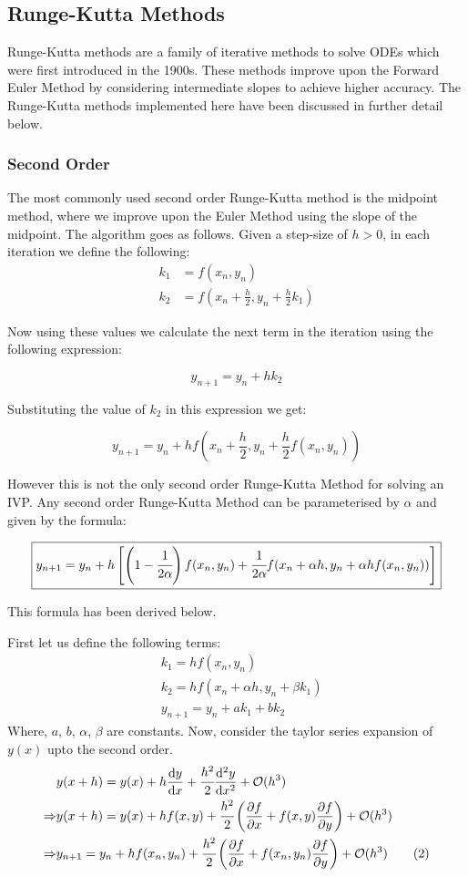 \documentclass{scrartcl}
\newcommand{\bigO}{\mathcal{O}}
\begin{document}
\subsection{Runge-Kutta Methods}
Runge-Kutta methods are a family of iterative methods to solve ODEs which were first introduced in the 1900s. These methods improve upon the Forward Euler Method by considering intermediate slopes to achieve higher accuracy. The Runge-Kutta methods implemented here have been discussed in further detail below.
\subsubsection{Second Order}
The most commonly used second order Runge-Kutta method is the midpoint method, where we improve upon the Euler Method using the slope of the midpoint. The algorithm goes as follows. Given a step-size of $h > 0$, in each iteration we define the following:
\begin{align*}
    k_1 &= f(x_n , y_n) \\
    k_2 &= f\left(x_n + \frac{h}{2}, y_n + \frac{h}{2}k_1\right)
\end{align*}

Now using these values we calculate the next term in the iteration using the following expression:

$$y_{n + 1} = y_n + hk_2$$

Substituting the value of $k_2$ in this expression we get:

$$\boxed{y_{n + 1} = y_n + hf\left(x_n + \frac{h}{2}, y_n + \frac{h}{2}f(x_n , y_n)\right)}$$

However this is not the only second order Runge-Kutta Method for solving an IVP. Any second order 
Runge-Kutta Method can be parameterised by $\alpha$ and given by the formula:

$$\boxed{y_{n+1} = y_n + h\left[\left(1 - \cfrac{1}{2\alpha}\right)f(x_n, y_n) + \cfrac{1}{2\alpha}f(x_n + \alpha h, y_n + \alpha hf(x_n, y_n))\right]}$$

This formula has been derived below. 

First let us define the following terms:
\begin{align*}
    &k_1 = hf(x_n, y_n) \\
    &k_2 = hf(x_n + \alpha h, y_n + \beta k_1) \\
    &y_{n+1} = y_n + ak_1 + bk_2 \tag{1}
\end{align*}
Where, $a$, $b$, $\alpha$, $\beta$ are constants.
Now, consider the taylor series expansion of $y(x)$ upto the second order.
\begin{align*}
    &y(x + h) = y(x) + h\dv{y}{x} + \cfrac{h^2}{2} \dv[2]{y}{x} + \bigO(h^3) \\
    \Rightarrow &y(x + h) = y(x) + hf(x, y) + \cfrac{h^2}{2}\left(\pdv{f}{x} + f(x, y)\pdv{f}{y}\right) + \bigO(h^3)\\ 
    \Rightarrow &y_{n+1} = y_n + hf(x_n, y_n) + \cfrac{h^2}{2}\left(\pdv{f}{x} + f(x_n, y_n)\pdv{f}{y}\right) + \bigO(h^3) \tag{2}\\ 
\end{align*}
\end{document}
